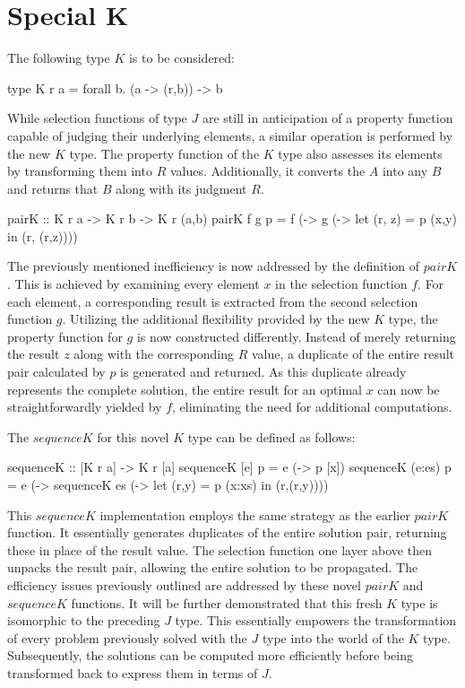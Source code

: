 \documentclass[runningheads]{llncs}
\begin{document}
\section{Special K}\label{special-k}

The following type \(K\) is to be considered:

\begin{code}
type K r a = forall b. (a -> (r,b)) -> b
\end{code}

While selection functions of type \(J\) are still in anticipation of a
property function capable of judging their underlying elements, a
similar operation is performed by the new \(K\) type. The property
function of the \(K\) type also assesses its elements by transforming
them into \(R\) values. Additionally, it converts the \(A\) into any
\(B\) and returns that \(B\) along with its judgment \(R\).

\begin{code}
pairK :: K r a -> K r b -> K r (a,b)
pairK f g p = f (\x -> 
              g (\y -> let (r, z) = p (x,y) 
                       in (r, (r,z))))
\end{code}

The previously mentioned inefficiency is now addressed by the definition
of \(pairK\). This is achieved by examining every element \(x\) in the
selection function \(f\). For each element, a corresponding result is
extracted from the second selection function \(g\). Utilizing the
additional flexibility provided by the new \(K\) type, the property
function for \(g\) is now constructed differently. Instead of merely
returning the result \(z\) along with the corresponding \(R\) value, a
duplicate of the entire result pair calculated by \(p\) is generated and
returned. As this duplicate already represents the complete solution,
the entire result for an optimal \(x\) can now be straightforwardly
yielded by \(f\), eliminating the need for additional computations.

The \(sequenceK\) for this novel \(K\) type can be defined as follows:

\begin{code}
sequenceK :: [K r a] -> K r [a]
sequenceK [e] p    = e (\x -> p [x])
sequenceK (e:es) p = e (\x -> sequenceK es 
                       (\xs -> let (r,y) = p (x:xs) 
                               in (r,(r,y))))
\end{code}

This \(sequenceK\) implementation employs the same strategy as the
earlier \(pairK\) function. It essentially generates duplicates of the
entire solution pair, returning these in place of the result value. The
selection function one layer above then unpacks the result pair,
allowing the entire solution to be propagated. The efficiency issues
previously outlined are addressed by these novel \(pairK\) and
\(sequenceK\) functions. It will be further demonstrated that this fresh
\(K\) type is isomorphic to the preceding \(J\) type. This essentially
empowers the transformation of every problem previously solved with the
\(J\) type into the world of the \(K\) type. Subsequently, the solutions
can be computed more efficiently before being transformed back to
express them in terms of \(J\).
\end{document}
